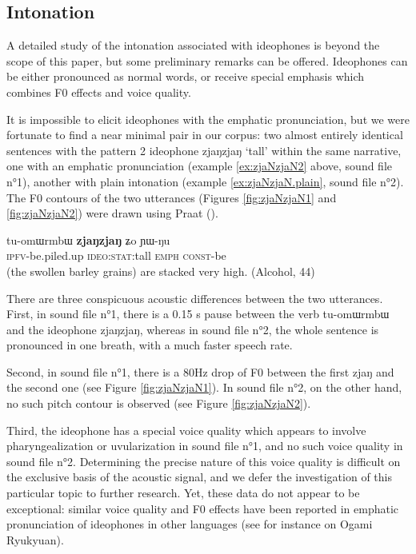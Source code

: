 \documentclass[oldfontcommands,oneside,a4paper,11pt]{article}
\newcommand{\ipa}[1]{{\phon \mbox{#1}}} %
\begin{document}
\subsection{Intonation}
A detailed study of the intonation associated with ideophones is beyond the scope of this paper, but some preliminary remarks can be offered. Ideophones can be either pronounced as normal words, or receive special emphasis which combines F0 effects and voice quality. 

It is impossible to elicit ideophones with the emphatic pronunciation, but we were fortunate to find a near minimal pair in our corpus: two almost entirely identical sentences with the pattern 2 ideophone \ipa{zjaŋzjaŋ} `tall' within the same narrative, one  with an emphatic pronunciation (example \ref{ex:zjaNzjaN2} above, sound file n°1), another with plain intonation (example \ref{ex:zjaNzjaN.plain}, sound file n°2). The F0 contours of the two utterances (Figures  \ref{fig:zjaNzjaN1} and  \ref{fig:zjaNzjaN2}) were drawn using Praat (\citealt{boersma.praat}).

  \begin{exe} 
\ex  \label{ex:zjaNzjaN.plain}
\gll 
 	\ipa{tu-omɯrmbɯ}  	\ipa{\textbf{zjaŋzjaŋ}}  	\ipa{ʑo}  	\ipa{ɲɯ-ŋu}  \\
  \textsc{ipfv}-be.piled.up \textsc{ideo:stat}:tall \textsc{emph} \textsc{const}-be  \\
 \glt  (the swollen barley grains) are stacked very high.  (Alcohol, 44)
 \end{exe}
 
 
 There are three conspicuous acoustic differences between the two utterances. First, in sound file n°1, there is a 0.15 s pause between the verb 	\ipa{tu-omɯrmbɯ} and the ideophone \ipa{zjaŋzjaŋ}, whereas in sound file n°2, the whole sentence is pronounced in one breath, with a much faster speech rate. 
 
  Second, in sound file n°1, there is a 80Hz drop of F0 between the first \ipa{zjaŋ} and the second one (see Figure \ref{fig:zjaNzjaN1}). In sound file n°2, on the other hand, no such pitch contour is observed (see Figure \ref{fig:zjaNzjaN2}).

Third, the ideophone has a special voice quality which appears to involve pharyngealization or uvularization in sound file n°1, and no such voice quality     in sound file n°2. Determining the precise nature of this voice quality is difficult on the exclusive basis of the acoustic signal, and we defer the investigation of this particular topic to further research. Yet, these data do not appear to be exceptional: similar voice quality and F0 effects have been reported in emphatic pronunciation of ideophones in other languages (see for instance \citealt[109]{pellard09ogami} on Ogami Ryukyuan).
 
\end{document}
